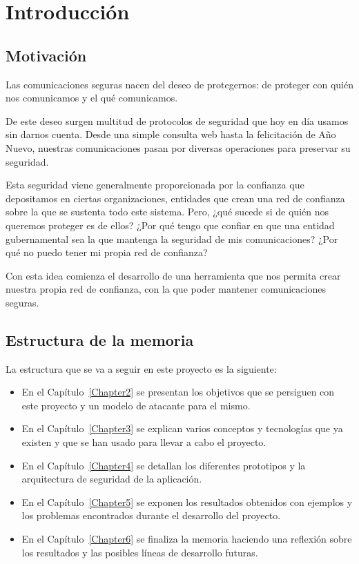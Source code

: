 
\chapter{Introducción} %

\label{Chapter1}


\section{Motivación}

Las comunicaciones seguras nacen del deseo de protegernos: de proteger con quién nos comunicamos y el qué comunicamos.

De este deseo surgen multitud de protocolos de seguridad que hoy en día usamos sin darnos cuenta.
Desde una simple consulta web hasta la felicitación de Año Nuevo, nuestras comunicaciones pasan por diversas operaciones para preservar su seguridad.

Esta seguridad viene generalmente proporcionada por la confianza que depositamos en ciertas organizaciones,
entidades que crean una red de confianza sobre la que se sustenta todo este sistema.
Pero, ¿qué sucede si de quién nos queremos proteger es de ellos? ¿Por qué tengo
que confiar en que una entidad gubernamental sea la que mantenga la seguridad
de mis comunicaciones? ¿Por qué no puedo tener mi propia red de confianza?

Con esta idea comienza el desarrollo de una herramienta que nos permita crear
nuestra propia red de confianza, con la que poder mantener comunicaciones
seguras.


\section{Estructura de la memoria}

La estructura que se va a seguir en este proyecto es la siguiente:

\begin{itemize}
  \item En el Capítulo~\ref{Chapter2} se presentan los objetivos que se persiguen con este proyecto y un modelo de atacante para el mismo.
  \item En el Capítulo~\ref{Chapter3} se explican varios conceptos y tecnologías que ya existen y que se han usado para llevar a cabo el proyecto.
  \item En el Capítulo~\ref{Chapter4} se detallan los diferentes prototipos y la arquitectura de seguridad de la aplicación.
  \item En el Capítulo~\ref{Chapter5} se exponen los resultados obtenidos con ejemplos y los problemas encontrados durante el desarrollo del proyecto.
  \item En el Capítulo~\ref{Chapter6} se finaliza la memoria haciendo una reflexión sobre los resultados y las posibles líneas de desarrollo futuras.
\end{itemize}
